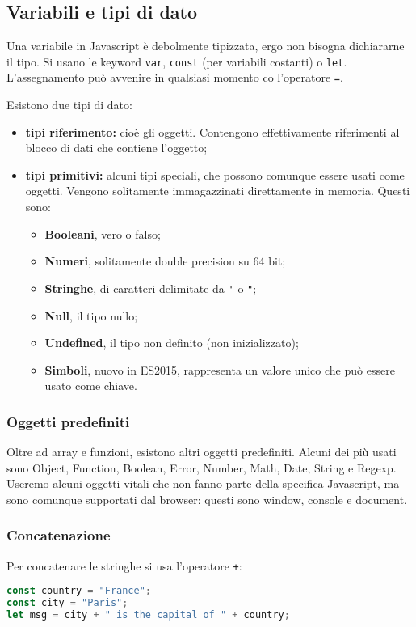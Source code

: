 \documentclass[a4paper,11pt]{article}
\begin{document}
\subsection{Variabili e tipi di dato}
Una variabile in Javascript è debolmente tipizzata, ergo non bisogna dichiararne il tipo.
Si usano le keyword \lstinline|var|, \lstinline|const| (per variabili costanti) o \lstinline|let|.
L'assegnamento può avvenire in qualsiasi momento co l'operatore \lstinline|=|.

Esistono due tipi di dato:
\begin{itemize}
	\item \textbf{tipi riferimento:} cioè gli oggetti. Contengono effettivamente riferimenti al blocco di dati che contiene l'oggetto;
	\item \textbf{tipi primitivi:} alcuni tipi speciali, che possono comunque essere usati come oggetti. Vengono solitamente immagazzinati direttamente in memoria.
		Questi sono:
		\begin{itemize}
			\item \textbf{Booleani}, vero o falso;
			\item \textbf{Numeri}, solitamente double precision su 64 bit;
			\item \textbf{Stringhe}, di caratteri delimitate da \lstinline|'| o \lstinline|"|;
			\item \textbf{Null}, il tipo nullo;
			\item \textbf{Undefined}, il tipo non definito (non inizializzato);
			\item \textbf{Simboli}, nuovo in ES2015, rappresenta un valore unico che può essere usato come chiave.
		\end{itemize}
\end{itemize}

\subsubsection{Oggetti predefiniti}
Oltre ad array e funzioni, esistono altri oggetti predefiniti.
Alcuni dei più usati sono Object, Function, Boolean, Error, Number, Math, Date, String e Regexp.
Useremo alcuni oggetti vitali che non fanno parte della specifica Javascript, ma sono comunque supportati dal browser: questi sono window, console e document.

\subsubsection{Concatenazione}
Per concatenare le stringhe si usa l'operatore \lstinline|+|:
\begin{lstlisting}[language=javascript, style=codestyle]	
const country = "France";
const city = "Paris";
let msg = city + " is the capital of " + country;
\end{lstlisting}
\end{document}
